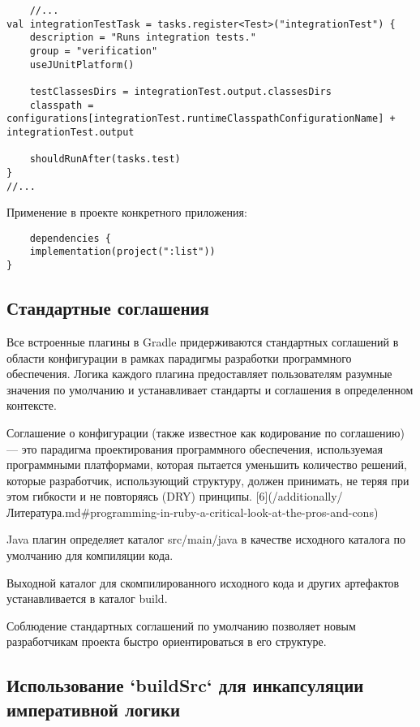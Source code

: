 \begin{lstlisting}
    //...
val integrationTestTask = tasks.register<Test>("integrationTest") {
    description = "Runs integration tests."
    group = "verification"
    useJUnitPlatform()

    testClassesDirs = integrationTest.output.classesDirs
    classpath = configurations[integrationTest.runtimeClasspathConfigurationName] + integrationTest.output

    shouldRunAfter(tasks.test)
}
//...
\end{lstlisting}

Применение в проекте конкретного приложения:

\begin{lstlisting}
    dependencies {
    implementation(project(":list"))
}
\end{lstlisting}

\subsection{Стандартные соглашения}

Все встроенные плагины в Gradle придерживаются стандартных соглашений в области конфигурации в
рамках парадигмы разработки программного обеспечения. Логика каждого плагина предоставляет
пользователям разумные значения по умолчанию и устанавливает стандарты и соглашения в определенном
контексте.

Соглашение о конфигурации (также известное как кодирование по соглашению) — это парадигма
проектирования программного обеспечения, используемая программными платформами, которая пытается
уменьшить количество решений, которые разработчик, использующий структуру, должен принимать, не
теряя при этом гибкости и не повторяясь (DRY)
принципы. [6](/additionally/Литература.md\#programming-in-ruby-a-critical-look-at-the-pros-and-cons)

Java плагин определяет каталог src/main/java в качестве исходного каталога по умолчанию для
компиляции кода.

Выходной каталог для скомпилированного исходного кода и других артефактов
устанавливается в каталог build.

Соблюдение стандартных соглашений по умолчанию позволяет новым разработчикам проекта быстро
ориентироваться в его структуре.

\subsection{Использование `buildSrc` для инкапсуляции императивной логики}

